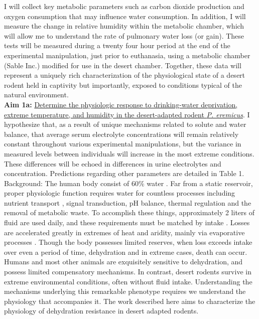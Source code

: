 \documentclass[11pt]{article}
\begin{document}
I will collect key metabolic parameters such as carbon dioxide production and oxygen consumption that may influence water consumption. In addition, I will measure the change in relative humidity within the metabolic chamber, which will allow me to understand the rate of pulmonary water loss (or gain). These tests will be measured during a twenty four hour period at the end of the experimental manipulation, just prior to euthanasia, using a metabolic chamber (Sable Inc.) modified for use in the desert chamber. Together, these data will represent a uniquely rich characterization of the physiological state of a desert rodent held in captivity but importantly, exposed to conditions typical of the natural environment. \\


\noindent \textbf{Aim 1a:} \ul{Determine the physiologic response to drinking-water deprivation, extreme temperature, and humidity in the desert-adapted rodent \textit{P. eremicus}}. I hypothesize that, as a result of unique mechanisms related to solute and water balance, that average serum electrolyte concentrations will remain relatively constant throughout various experimental manipulations, but the variance in measured levels between individuals will increase in the most extreme conditions. These differences will be echoed in differences in urine electrolytes and concentration. Predictions regarding other parameters are detailed in Table 1. \\


Background: The human body consist of 60\% water \citep{Jequier:2009cz}. Far from a static reservoir, proper physiologic function requires water for countless processes including nutrient transport \citep{Haussinger:1996wl}, signal transduction, pH balance, thermal regulation \citep{Montain:1999ux} and the removal of metabolic waste. To accomplish these things, approximately 2 liters of fluid are used daily, and these requirements must be matched by intake \citep{Jequier:2009cz}. Losses are accelerated greatly in extremes of heat and aridity, mainly via evaporative processes \citep{Cheuvront:2010eg}. Though the body possesses limited reserves, when loss exceeds intake over even a period of time, dehydration and in extreme cases, death can occur. Humans and most other animals are exquisitely sensitive to dehydration, and possess limited compensatory mechanisms. In contrast, desert rodents survive in extreme environmental conditions, often without fluid intake. Understanding the mechanisms underlying this remarkable phenotype requires we understand the physiology that accompanies it. The work described here aims to characterize the physiology of dehydration resistance in desert adapted rodents. \\
\end{document}
